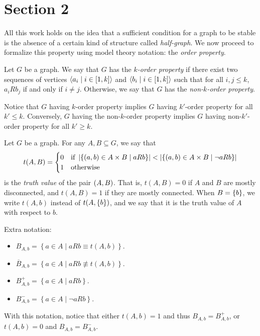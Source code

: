 \section{Section 2} \label{sec:section_2}

    All this work holds on the idea that a sufficient condition for a graph to be stable is the absence of
    a certain kind of structure called \emph{half-graph}.
    We now proceed to formalize this property using model theory notation: the \emph{order property}.

    \label{def:k_order_property}
        Let $G$ be a graph.
        We say that $G$ has the \emph{$k$-order property} if there exist two sequences of vertices
        $\left< a_i \mid i \in \left[ 1, k \right] \right>$ and $\left< b_i \mid i \in \left[ 1, k \right] \right>$ such that
        for all $i,j \leq k$, $a_i R b_j$ if and only if $i \neq j$.
        Otherwise, we say that $G$ has the \emph{non-$k$-order property}.

    \remark
    Notice that $G$ having $k$-order property implies $G$ having $k'$-order property for all $k' \leq k$.
    Conversely, $G$ having the non-$k$-order property implies $G$ having non-$k'$-order property for all $k' \geq k$.

    \label{def:truth_value}
        Let $G$ be a graph.
        For any $A, B \subseteq G$, we say that
        $$
            t(A,B) =
            \begin{cases}
                0 & \text{if } \left| \left\{ \left( a, b \right) \in A \times B \mid a R b \right\} \right| <
                    \left| \left\{ \left( a, b \right) \in A \times B \mid \neg a R b \right\} \right| \\
                1 & \text{otherwise}
            \end{cases}
        $$
        is the \emph{truth value} of the pair $\left( A,B \right)$.
        That is, $t(A,B) = 0$ if $A$ and $B$ are mostly disconnected, and $t(A,B) = 1$ if they are mostly connected.
        When $B = \left\{ b \right\}$, we write $t(A,b)$ instead of $t(A,\left\{ b \right\})$, and we say that it is the truth value of $A$
        with respect to $b$.
    \newline

    Extra notation:
    \begin{itemize}
        \item $B_{A,b} = \left\{ a \in A \mid a R b \equiv t(A,b) \right\}$.
        \item $\overline{B}_{A,b} = \left\{ a \in A \mid a R b \not\equiv t(A,b) \right\}$.
        \item $B^+_{A,b} = \left\{ a \in A \mid a R b \right\}$.
        \item $B^-_{A,b} = \left\{ a \in A \mid \neg a R b \right\}$.
    \end{itemize}
    With this notation, notice that either $t(A,b) = 1$ and thus $B_{A,b} = B^+_{A,b}$, or $t(A,b) = 0$ and $B_{A,b} = B^-_{A,b}$.

